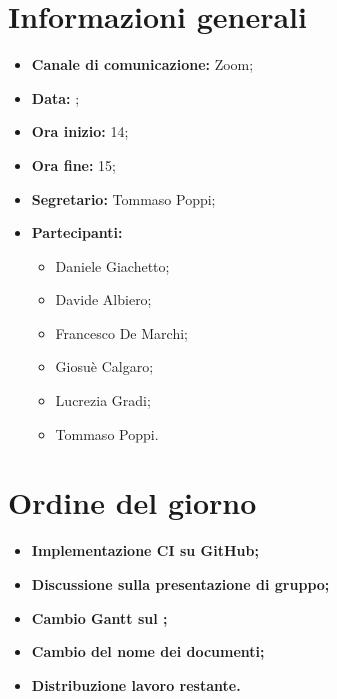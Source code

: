 \section{Informazioni generali}

\begin{itemize}

	\item \textbf{Canale di comunicazione:} Zoom;
	
	\item \textbf{Data:} \DataMeeting{};
	
	\item \textbf{Ora inizio:} 14;
	
	\item \textbf{Ora fine:} 15;
	
	\item \textbf{Segretario:} Tommaso Poppi;
	
	\item \textbf{Partecipanti:}
	
		\begin{itemize}

			\item Daniele Giachetto;
			\item Davide Albiero;
			\item Francesco De Marchi;
			\item Giosuè Calgaro;
			\item Lucrezia Gradi;
			\item Tommaso Poppi.

		\end{itemize}

\end{itemize}



\section{Ordine del giorno}

\begin{itemize}

	\item\textbf{Implementazione CI su GitHub;}
	
	\item\textbf{Discussione sulla presentazione di gruppo;}

	\item\textbf{Cambio Gantt sul \PdP{};}

	\item\textbf{Cambio del nome dei documenti;}
	
	\item\textbf{Distribuzione lavoro restante.}

\end{itemize}


